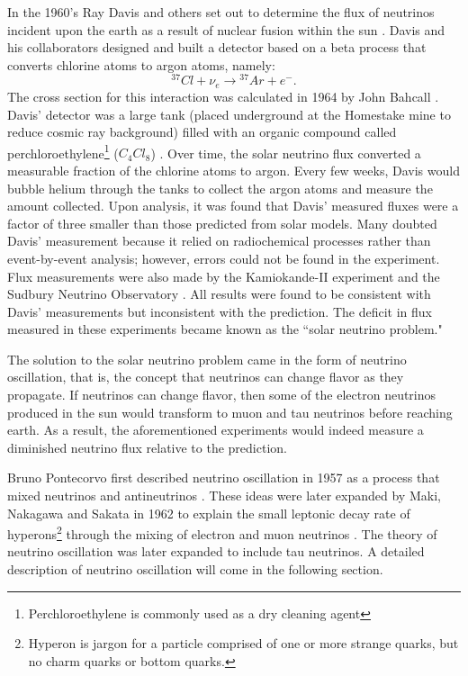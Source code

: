 In the 1960's Ray Davis and others set out to determine the flux of neutrinos
incident upon the earth as a result of nuclear fusion within the sun
\cite{davis}.  Davis
and his collaborators designed and built a detector based on a beta process
that converts chlorine atoms to argon atoms, namely:
\begin{equation}\label{nuChlorCap}
{}^{37}Cl + \nu_e  \rightarrow {}^{37}Ar + e^-.
\end{equation}
The cross section for this interaction was calculated in 1964 by John Bahcall
\cite{bahcall}.  Davis' detector was a large tank (placed underground at the
Homestake mine to reduce cosmic ray background) filled with an organic compound
called perchloroethylene\footnote{Perchloroethylene is commonly used as
a dry cleaning agent} ($C_4Cl_8$)  \cite{davis}.
Over time, the solar
neutrino flux converted a measurable fraction of the chlorine atoms to argon.
Every few weeks, Davis would bubble helium through the tanks to collect the
argon atoms and measure the amount collected.  Upon analysis, it was found that
Davis' measured fluxes were a factor of three smaller than those predicted from
solar models.  Many doubted Davis' measurement because it relied on
radiochemical processes rather than event-by-event analysis; however, errors
could not be found in the experiment.  Flux measurements were also made by the
Kamiokande-II experiment and the Sudbury Neutrino Observatory
\cite{kamiokande, sno}.
All results were found to be consistent with Davis' measurements but
inconsistent with the prediction.  The deficit in flux measured in these
experiments became known as the ``solar neutrino problem."


The solution to the solar neutrino problem came in the form of neutrino
oscillation, that is, the concept that neutrinos can change flavor as they
propagate.  If neutrinos can change flavor, then some of the electron neutrinos
produced in the sun would transform to muon and tau neutrinos before reaching
earth.  As a result, the aforementioned experiments would indeed measure a
diminished neutrino flux relative to the prediction.

Bruno Pontecorvo first described neutrino oscillation in 1957 as a process
that mixed neutrinos and antineutrinos  \cite{pontecorvo}.  These ideas were
later expanded by Maki, Nakagawa and Sakata in 1962 to explain the small
leptonic decay rate of hyperons\footnote{Hyperon is jargon for a particle
comprised of
one or more strange quarks, but no charm quarks or bottom quarks.} through the
mixing of electron and muon neutrinos \cite{maki1962remarks}.  The theory of
neutrino oscillation was
later expanded to include tau neutrinos.  A detailed description of neutrino
oscillation will come in the following section.


